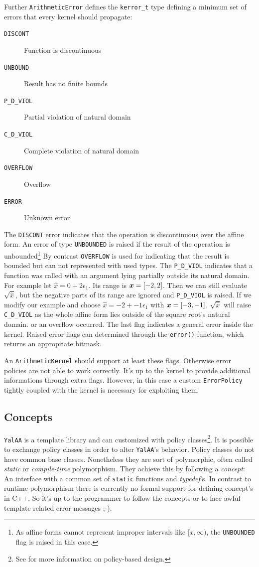\documentclass[a4]{scrartcl}
\newcommand{\iv}[2]{\ensuremath{[#1, #2]}\xspace}
\newcommand{\aff}[1]{\ensuremath{\hat{#1}}\xspace}
\newcommand{\yalaa}{\texttt{YalAA}\xspace}
\begin{document}
Further \texttt{ArithmeticError} defines the \texttt{kerror\_t} type defining
a minimum set of errors that every kernel should propagate: 
\begin{description}
\item[\texttt{DISCONT}] Function is discontinuous
\item[\texttt{UNBOUND}] Result has no finite bounds
\item[\texttt{P\_D\_VIOL}] Partial violation of natural domain
\item[\texttt{C\_D\_VIOL}] Complete violation of natural domain
\item[\texttt{OVERFLOW}] Overflow 
\item[\texttt{ERROR}] Unknown error
\end{description}
The \texttt{DISCONT} error indicates that the operation is discontinuous over
the affine form.  An error of type \texttt{UNBOUNDED} is raised if the result
of the operation is unbounded\footnote{As affine forms cannot represent
  improper intervals like $[x, \infty)$, the \texttt{UNBOUNDED} flag is raised
  in this case.} By contrast \texttt{OVERFLOW} is used for indicating that the
result is bounded but can not represented with used types. The
\texttt{P\_D\_VIOL} indicates that a function was called with an argument
lying partially outside its natural domain. For example let $\aff x = 0 +
2\epsilon_1$. Its range is $\x = \iv{-2}{2}$. Then we can still evaluate
$\sqrt{\aff x}$, but the negative parts of its range are ignored and
\texttt{P\_D\_VIOL} is raised. If we modify our example and choose $\aff x =
-2 + -1 \epsilon_1$ with $\x = \iv{-3}{-1}$, $\sqrt{\aff x}$ will raise
\texttt{C\_D\_VIOL} as the whole affine form lies outside of the square root's
natural domain.  or an overflow occurred. The last flag indicates a general
error inside the kernel.  Raised error flags can determined through the
\texttt{error()} function, which returns an appropriate bitmask.

An \texttt{ArithmeticKernel} should support at least these flags. Otherwise
error policies are not able to work correctly. It's up to the kernel to
provide additional informations through extra flags. However, in this case a
custom \texttt{ErrorPolicy} tightly coupled with the kernel is necessary for
exploiting them.

\subsection{Concepts}
\label{sec:concepts}
\yalaa is a template library and can customized with policy
classes\footnote{See \cite{...} for more information on policy-based
  design.}. It is possible to exchange policy classes in order to alter
\yalaa's behavior. Policy classes do not have common base classes. Nonetheless
they are sort of polymorphic, often called \emph{static} or
\emph{compile-time} polymorphism. They achieve this by following a
\emph{concept}: An interface with a common set of \texttt{static} functions
and \emph{typedef}'s. In contrast to
runtime-polymorphism there is currently no formal support for defining
concept's in C++. So it's up to the programmer to follow the concepts or to
face awful template related error messages ;-).
\end{document}
